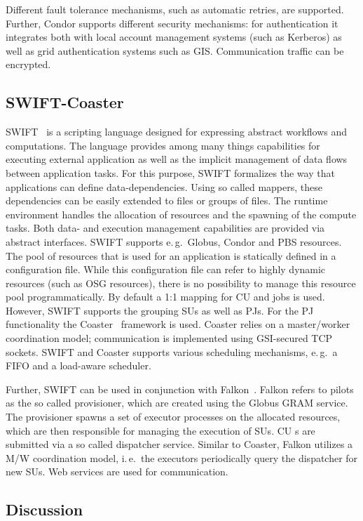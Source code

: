 \documentclass[conference,final]{IEEEtran}
\newcommand{\cu}{CU\xspace}
\newcommand{\upp}{\vspace*{-0.5em}}
\begin{document}
Different fault tolerance mechanisms, such as automatic retries, are
supported.  Further, Condor supports different security mechanisms:
for authentication it integrates both with local account management
systems (such as Kerberos) as well as grid authentication systems such
as GIS. Communication traffic can be encrypted.


\upp
\subsection{SWIFT-Coaster\upp\upp}

SWIFT~\cite{Wilde2011} is a scripting language designed for expressing
abstract workflows and computations. The language provides among many
things capabilities for executing external application as well as the
implicit management of data flows between application tasks. For this
purpose, SWIFT formalizes the way that applications can define
data-dependencies. Using so called mappers, these dependencies can be
easily extended to files or groups of files. The runtime environment
handles the allocation of resources and the spawning of the compute
tasks. Both data- and execution management capabilities are provided
via abstract interfaces. SWIFT supports e.\,g.\ Globus, Condor and PBS
resources.  The pool of resources that is used for an application is
statically defined in a configuration file. While this configuration
file can refer to highly dynamic resources (such as OSG resources),
there is no possibility to manage this resource pool
programmatically. By default a 1:1 mapping for \cu and jobs is
used. However, SWIFT supports the grouping SUs as well as PJs. For the
PJ functionality the Coaster~\cite{coasters} framework is
used. Coaster relies on a master/worker coordination model;
communication is implemented using GSI-secured TCP sockets. SWIFT and
Coaster supports various scheduling mechanisms, e.\,g.\ a FIFO and a
load-aware scheduler.

Further, SWIFT can be used in conjunction with Falkon~\cite{1362680}. Falkon
refers to pilots as the so called provisioner, which are created using the
Globus GRAM service. The provisioner spawns a set of executor processes on the
allocated resources, which are then responsible for managing the execution of
SUs. \cu s are submitted via a so called dispatcher service. Similar to Coaster,
Falkon utilizes a M/W coordination model, i.\,e.\ the executors periodically
query the dispatcher for new SUs. Web services are used for communication.


\subsection{Discussion}
\end{document}

